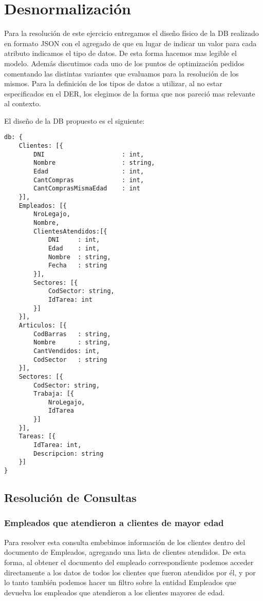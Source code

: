 \section{Desnormalizaci\'on}

Para la resoluci\'on de este ejercicio entregamos el dise\~no f\'isico de la DB realizado en formato JSON con el agregado de que en lugar de indicar un valor para cada atributo indicamos el tipo de datos. De esta forma hacemos mas legible el modelo. Adem\'as discutimos cada uno de los puntos de optimizaci\'on pedidos comentando las distintas variantes que evaluamos para la resoluci\'on de los mismos. Para la definici\'on de los tipos de datos a utilizar, al no estar especificados en el DER, los elegimos de la forma que nos pareci\'o mas relevante al contexto.

El dise\~no de la DB propuesto es el siguiente:
   
\begin{lstlisting}
db: {
	Clientes: [{
		DNI						: int,
		Nombre					: string,
		Edad					: int,
		CantCompras				: int,
		CantComprasMismaEdad	: int
	}], 
	Empleados: [{
		NroLegajo,
		Nombre,
		ClientesAtendidos:[{ 
			DNI		: int, 
			Edad	: int,
			Nombre	: string,
			Fecha	: string
		}],
		Sectores: [{
			CodSector: string,
			IdTarea: int
		}]
	}],
	Articulos: [{
		CodBarras	: string,
		Nombre		: string,
		CantVendidos: int,
		CodSector	: string
	}],
	Sectores: [{
		CodSector: string,
		Trabaja: [{
			NroLegajo, 
			IdTarea
		}]
	}],
	Tareas: [{
		IdTarea: int,
		Descripcion: string
	}]
}
\end{lstlisting}

\subsection{Resoluci\'on de Consultas}

\subsubsection{Empleados que atendieron a clientes de mayor edad}

Para resolver esta consulta embebimos informaci\'on de los clientes dentro del documento de Empleados, agregando una lista de clientes atendidos. De esta forma, al obtener el documento del empleado correspondiente podemos acceder directamente a los datos de todos los clientes que fueron atendidos por \'el, y por lo tanto tambi\'en podemos hacer un filtro sobre la entidad Empleados que devuelva los empleados que atendieron a los clientes mayores de edad.

